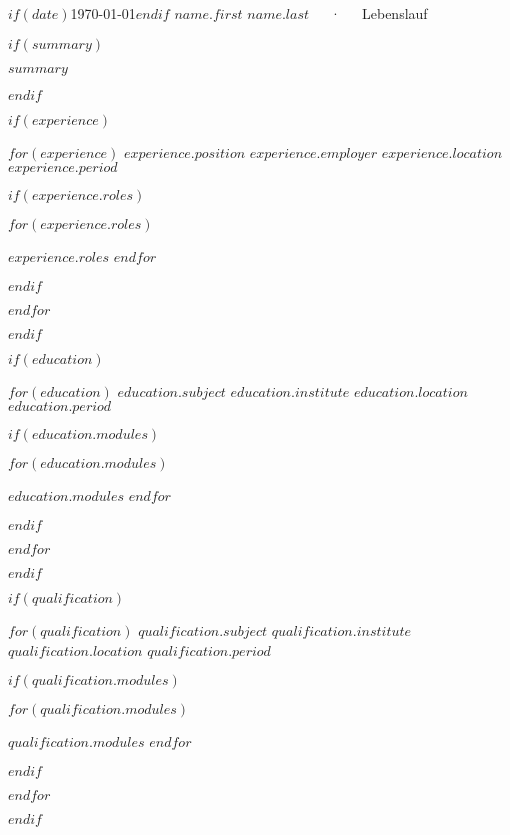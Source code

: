 \documentclass[11pt, a4paper]{awesome-cv}
\begin{document}
\makecvheader

\makecvfooter
  {$if(date)$\today$endif$}
  {$name.first$ $name.last$~~~·~~~Lebenslauf}
  {\thepage}



$if(summary)$
  \begin{cvparagraph}

    $summary$
  \end{cvparagraph}
$endif$

$if(experience)$
  \begin{cventries}

    $for(experience)$
      \cventry
      {$experience.position$}
      {$experience.employer$}
      {$experience.location$}
      {$experience.period$}
      {
        $if(experience.roles)$
          \begin{cvitems}
            $for(experience.roles)$
              \item {$experience.roles$}
            $endfor$
          \end{cvitems}
        $endif$
      }

    $endfor$
  \end{cventries}
$endif$

$if(education)$
  \begin{cventries}
    $for(education)$
      \cventry
      {$education.subject$}
      {$education.institute$}
      {$education.location$}
      {$education.period$}
      {
        $if(education.modules)$
          \begin{cvitems}
            $for(education.modules)$
              \item {$education.modules$}
            $endfor$
          \end{cvitems}
        $endif$
      }
    $endfor$
  \end{cventries}
$endif$

$if(qualification)$
  \begin{cventries}
    $for(qualification)$
      \cventry
      {$qualification.subject$}
      {$qualification.institute$}
      {$qualification.location$}
      {$qualification.period$}
      {
        $if(qualification.modules)$
          \begin{cvitems}
            $for(qualification.modules)$
              \item {$qualification.modules$}
            $endfor$
          \end{cvitems}
        $endif$
      }
    $endfor$
  \end{cventries}
$endif$
\end{document}
